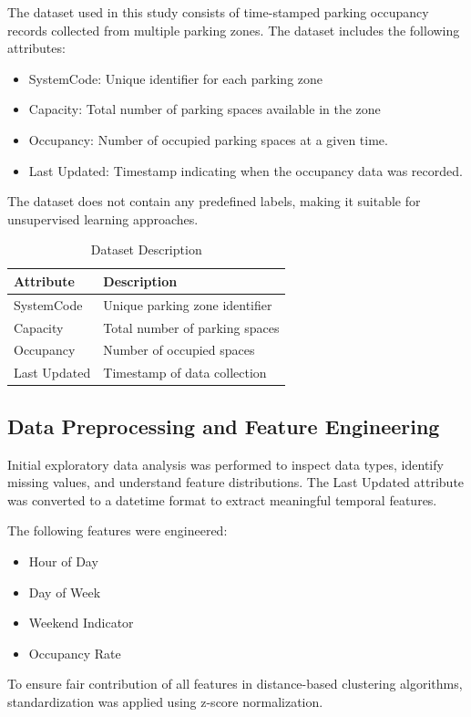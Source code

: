 \documentclass[conference]{IEEEtran}
\renewcommand{\arraystretch}{1.3}
\begin{document}
The dataset used in this study consists of time-stamped parking occupancy records collected from multiple parking zones. The dataset includes the following attributes:
\begin{itemize}
    \item SystemCode: Unique identifier for each parking zone
    \item Capacity: Total number of parking spaces available in the zone
    \item Occupancy: Number of occupied parking spaces at a given time.
    \item Last Updated: Timestamp indicating when the occupancy data was recorded.
\end{itemize}

The dataset does not contain any predefined labels, making it suitable for unsupervised learning approaches.

\begin{table}[htbp]
\caption{Dataset Description}
\centering
\renewcommand{\arraystretch}{1.3}
\begin{tabular}{ll}
\toprule
\textbf{Attribute} & \textbf{Description} \\
\midrule
SystemCode & Unique parking zone identifier \\
Capacity & Total number of parking spaces \\
Occupancy & Number of occupied spaces \\
Last Updated & Timestamp of data collection \\
\bottomrule
\end{tabular}
\label{tab:dataset}
\end{table}

\subsection{Data Preprocessing and Feature Engineering}

Initial exploratory data analysis was performed to inspect data types, identify missing values, and understand feature distributions. The Last Updated attribute was converted to a datetime format to extract meaningful temporal features.

The following features were engineered:
\begin{itemize}
    \item Hour of Day
    \item Day of Week
    \item Weekend Indicator
    \item Occupancy Rate
\end{itemize}
To ensure fair contribution of all features in distance-based clustering algorithms, standardization was applied using z-score normalization.
\end{document}
